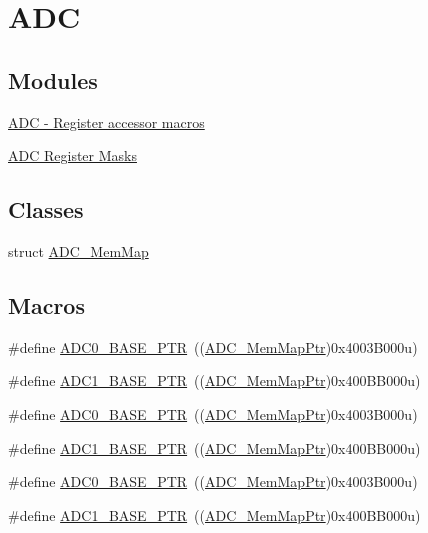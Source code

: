 \hypertarget{group___a_d_c___peripheral}{}\section{A\+DC}
\label{group___a_d_c___peripheral}
\subsection*{Modules}
\begin{DoxyCompactItemize}
\item 
\hyperlink{group___a_d_c___register___accessor___macros}{A\+D\+C -\/ Register accessor macros}
\item 
\hyperlink{group___a_d_c___register___masks}{A\+D\+C Register Masks}
\end{DoxyCompactItemize}
\subsection*{Classes}
\begin{DoxyCompactItemize}
\item 
struct \hyperlink{struct_a_d_c___mem_map}{A\+D\+C\+\_\+\+Mem\+Map}
\end{DoxyCompactItemize}
\subsection*{Macros}
\begin{DoxyCompactItemize}
\item 
\#define \hyperlink{group___a_d_c___peripheral_ga6cec2f227a3a37a9fccaa830740f1f5e}{A\+D\+C0\+\_\+\+B\+A\+S\+E\+\_\+\+P\+TR}~((\hyperlink{group___a_d_c___peripheral_ga1673c677bf7c0ca339c8563e06de75fa}{A\+D\+C\+\_\+\+Mem\+Map\+Ptr})0x4003\+B000u)
\item 
\#define \hyperlink{group___a_d_c___peripheral_ga7fb56938ede79eea2065c4294db3b2d3}{A\+D\+C1\+\_\+\+B\+A\+S\+E\+\_\+\+P\+TR}~((\hyperlink{group___a_d_c___peripheral_ga1673c677bf7c0ca339c8563e06de75fa}{A\+D\+C\+\_\+\+Mem\+Map\+Ptr})0x400\+B\+B000u)
\item 
\#define \hyperlink{group___a_d_c___peripheral_ga6cec2f227a3a37a9fccaa830740f1f5e}{A\+D\+C0\+\_\+\+B\+A\+S\+E\+\_\+\+P\+TR}~((\hyperlink{group___a_d_c___peripheral_ga1673c677bf7c0ca339c8563e06de75fa}{A\+D\+C\+\_\+\+Mem\+Map\+Ptr})0x4003\+B000u)
\item 
\#define \hyperlink{group___a_d_c___peripheral_ga7fb56938ede79eea2065c4294db3b2d3}{A\+D\+C1\+\_\+\+B\+A\+S\+E\+\_\+\+P\+TR}~((\hyperlink{group___a_d_c___peripheral_ga1673c677bf7c0ca339c8563e06de75fa}{A\+D\+C\+\_\+\+Mem\+Map\+Ptr})0x400\+B\+B000u)
\item 
\#define \hyperlink{group___a_d_c___peripheral_ga6cec2f227a3a37a9fccaa830740f1f5e}{A\+D\+C0\+\_\+\+B\+A\+S\+E\+\_\+\+P\+TR}~((\hyperlink{group___a_d_c___peripheral_ga1673c677bf7c0ca339c8563e06de75fa}{A\+D\+C\+\_\+\+Mem\+Map\+Ptr})0x4003\+B000u)
\item 
\#define \hyperlink{group___a_d_c___peripheral_ga7fb56938ede79eea2065c4294db3b2d3}{A\+D\+C1\+\_\+\+B\+A\+S\+E\+\_\+\+P\+TR}~((\hyperlink{group___a_d_c___peripheral_ga1673c677bf7c0ca339c8563e06de75fa}{A\+D\+C\+\_\+\+Mem\+Map\+Ptr})0x400\+B\+B000u)
\end{DoxyCompactItemize}
